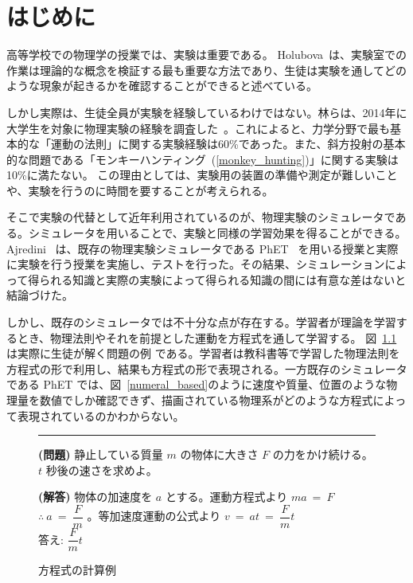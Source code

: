 \chapter{はじめに} \label{intro}

高等学校での物理学の授業では、実験は重要である。
Holubova~\cite{holubova_2019}は、実験室での作業は理論的な概念を検証する最も重要な方法であり、生徒は実験を通してどのような現象が起きるかを確認することができると述べている。

しかし実際は、生徒全員が実験を経験しているわけではない。林らは、2014年に大学生を対象に物理実験の経験を調査した~\cite{2015KJ00010038066}。これによると、力学分野で最も基本的な「運動の法則」に関する実験経験は60\%であった。また、斜方投射の基本的な問題である「モンキーハンティング~(\ref{monkey_hunting})」に関する実験は10\%に満たない。
この理由としては、実験用の装置の準備や測定が難しいことや、実験を行うのに時間を要することが考えられる。

そこで実験の代替として近年利用されているのが、物理実験のシミュレータである。シミュレータを用いることで、実験と同様の学習効果を得ることができる。Ajredini~\cite{ajredini_real_2014} は、既存の物理実験シミュレータである PhET~\cite{perkins_phet_2006} を用いる授業と実際に実験を行う授業を実施し、テストを行った。その結果、シミュレーションによって得られる知識と実際の実験によって得られる知識の間には有意な差はないと結論づけた。


しかし、既存のシミュレータでは不十分な点が存在する。学習者が理論を学習するとき、物理法則やそれを前提とした運動を方程式を通して学習する。
図~\ref{symbol_based}は実際に生徒が解く問題の例
である。学習者は教科書等で学習した物理法則を方程式の形で利用し、結果も方程式の形で表現される。一方既存のシミュレータである PhET では、図~\ref{numeral_based}のように速度や質量、位置のような物理量を数値でしか確認できず、描画されている物理系がどのような方程式によって表現されているのかわからない。

\begin{figure}[b]
\noindent\rule{\linewidth}{0.4pt}

\small{\textbf{(問題)} 静止している質量 $m$ の物体に大きさ $F$ の力をかけ続ける。$t$ 秒後の速さを求めよ。}

\small{\textbf{(解答)} 物体の加速度を $a$ とする。運動方程式より $ma~=~F$ $\therefore~a~=~\dfrac{F}{m}$ 。等加速度運動の公式より $v~=~at~=~\dfrac{F}{m}t$\\
答え: $\dfrac{F}{m}t$}

\caption{方程式の計算例} \label{symbol_based}
\end{figure}

